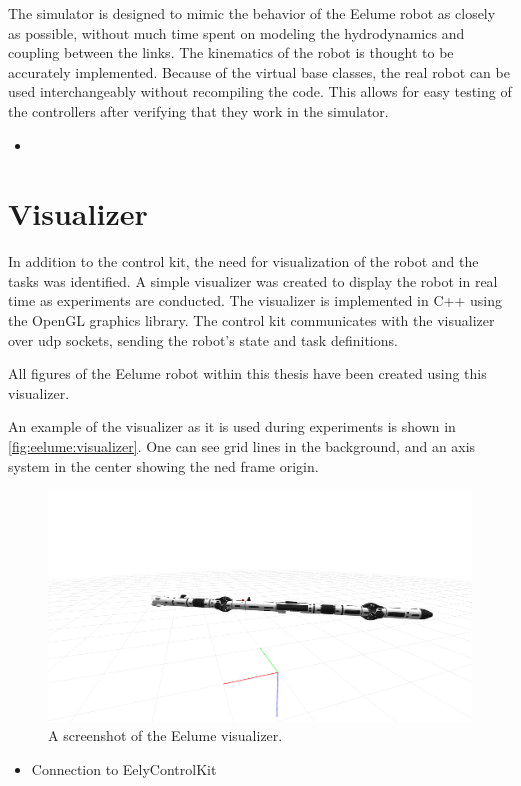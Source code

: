 The simulator is designed to mimic the behavior of the Eelume robot as closely
as possible, without much time spent on modeling the hydrodynamics and coupling
between the links. The kinematics of the robot is thought to be accurately
implemented. Because of the virtual base classes, the real robot can be used
interchangeably without recompiling the code. This allows for easy testing of
the controllers after verifying that they work in the simulator.

\begin{itemize}
    \item 
\end{itemize}

\section{Visualizer}

In addition to the control kit, the need for visualization of the robot and
the tasks was identified. A simple visualizer was created to display the robot
in real time as experiments are conducted. The visualizer is implemented in
C++ using the OpenGL graphics library. The control kit communicates with the
visualizer over \gls{udp} sockets, sending the robot's state and task definitions.

All figures of the Eelume robot within this thesis have been created using this visualizer.

An example of the visualizer as it is used during experiments is shown in
\autoref{fig:eelume:visualizer}. One can see grid lines in the background, and
an axis system in the center showing the \gls{ned} frame origin.
\begin{figure}[h!]
    \centering
    \includegraphics[width=\textwidth]{assets/eely-visualizer.png}
    \caption{A screenshot of the Eelume visualizer.}
    \label{fig:eelume:visualizer}
\end{figure}

\begin{itemize}
    \item Connection to EelyControlKit
\end{itemize}
